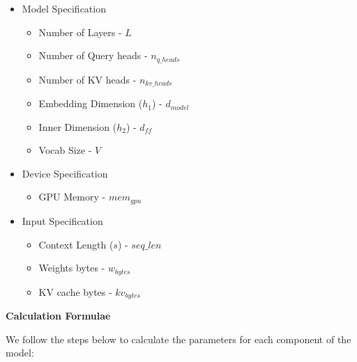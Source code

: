 \documentclass{article}
\begin{document}
\begin{itemize}
    \item Model Specification
    \begin{itemize}
        \item Number of Layers - $L$
        \item Number of Query heads - $n_{q\_heads}$
        \item Number of KV heads - $n_{kv\_heads}$
        \item Embedding Dimension ($h_1$) - $d_{model}$
        \item Inner Dimension ($h_2$) - $d_{ff}$
        \item Vocab Size - $V$
    \end{itemize}
    \item Device Specification
    \begin{itemize}
        \item GPU Memory - $mem_{gpu}$
    \end{itemize}
    \item Input Specification
    \begin{itemize}
        \item Context Length ($s$) - $seq\_len$
        \item Weights bytes - $w_{bytes}$
        \item KV cache bytes - $kv_{bytes}$
    \end{itemize}
\end{itemize}

\textbf{Calculation Formulae}

We follow the steps below to calculate the parameters for each component of the model:
\end{document}
